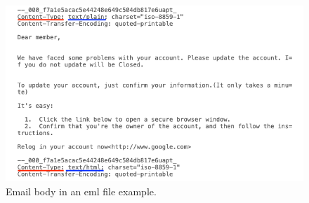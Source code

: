 \begin{figure}[H]
    \includegraphics[width=\linewidth]{figs/eml_body.png}
    \caption{Email body in an \ac{eml} file example.}
    \label{fig:c2:eml_body}
  \end{figure}